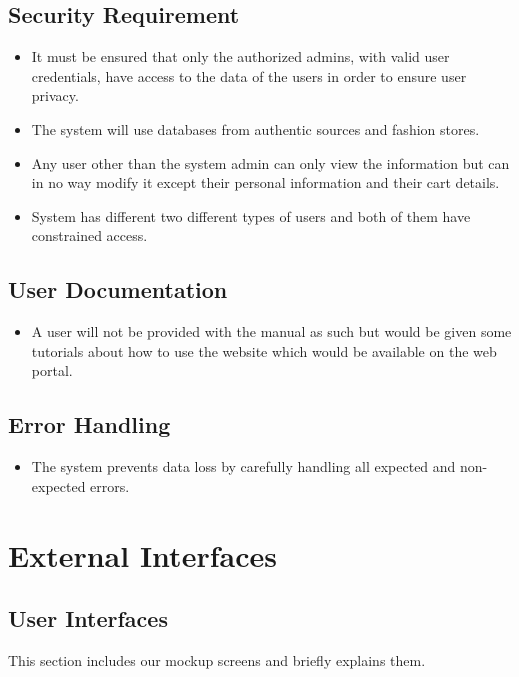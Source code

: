 \subsection{Security Requirement}
\begin{itemize}
    \item It must be ensured that only the authorized admins, with valid user credentials, have access to the data of the users in order to ensure user privacy. 
    
    \item The system will use databases from authentic sources and fashion stores.
    
    \item Any user other than the system admin can only view the information but can in no  way modify it except their personal information and their cart details.
    
    \item System has different two different types of users and both of them have constrained access. 
\end{itemize}

\subsection{User Documentation}
\begin{itemize}
    \item A user will not be provided with the manual as such but would be given some tutorials about how to use the website which would be available on the web portal. 
\end{itemize}

\subsection{Error Handling}
\begin{itemize}
    \item The system prevents data loss by carefully handling all expected and non-expected errors. 
\end{itemize}

\section{External Interfaces}

\subsection{User Interfaces}
This section includes our mockup screens and briefly explains them.

